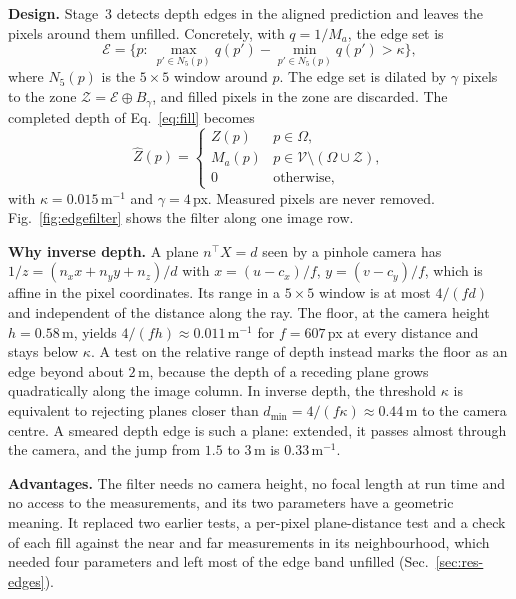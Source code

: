 \documentclass[conference]{IEEEtran}
\newcommand{\Dm}{Z}            %
\newcommand{\Dp}{M}            %
\newcommand{\Om}{\Omega}       %
\begin{document}
\textbf{Design.} Stage~3 detects depth edges in the aligned prediction and
leaves the pixels around them unfilled. Concretely, with \(q=1/\Dp_a\), the
edge set is
\begin{equation}
  \mathcal{E}=\Big\{p:\ \max_{p'\in N_5(p)} q(p')-\min_{p'\in N_5(p)} q(p')>\kappa\Big\},
  \label{eq:edges}
\end{equation}
where \(N_5(p)\) is the \(5{\times}5\) window around \(p\). The edge set is
dilated by \(\gamma\) pixels to the zone \(\mathcal{Z}=\mathcal{E}\oplus
B_\gamma\), and filled pixels in the zone are discarded. The completed depth
of Eq.~\eqref{eq:fill} becomes
\begin{equation}
  \hat \Dm(p) =
  \begin{cases}
    \Dm(p) & p\in\Om,\\
    \Dp_a(p) & p\in\mathcal{V}\setminus(\Om\cup\mathcal{Z}),\\
    0 & \text{otherwise},
  \end{cases}
  \label{eq:fillfinal}
\end{equation}
with \(\kappa=0.015\,\)m\(^{-1}\) and \(\gamma=4\,\)px. Measured pixels are
never removed. Fig.~\ref{fig:edgefilter} shows the filter along one image row.

\textbf{Why inverse depth.} A plane \(n^\top X=d\) seen by a pinhole camera has
\(1/z=(n_xx+n_yy+n_z)/d\) with \(x=(u-c_x)/f\), \(y=(v-c_y)/f\), which is affine
in the pixel coordinates. Its range in a \(5{\times}5\) window is at most
\(4/(fd)\) and independent of the distance along the ray. The floor, at the
camera height \(h=0.58\,\)m, yields \(4/(fh)\approx0.011\,\)m\(^{-1}\) for
\(f=607\,\)px at every distance and stays below \(\kappa\). A test on the relative
range of depth instead marks the floor as an edge beyond about \(2\,\)m, because
the depth of a receding plane grows quadratically along the image column. In
inverse depth, the threshold \(\kappa\) is equivalent to rejecting planes closer
than \(d_{\min}=4/(f\kappa)\approx0.44\,\)m to the camera centre. A smeared
depth edge is such a plane: extended, it passes almost through the camera, and
the jump from \(1.5\) to \(3\,\)m is \(0.33\,\)m\(^{-1}\).

\textbf{Advantages.} The filter needs no camera height, no focal length at run
time and no access to the measurements, and its two parameters have a
geometric meaning. It replaced two earlier tests, a per-pixel plane-distance
test and a check of each fill against the near and far measurements in its
neighbourhood, which needed four parameters and left most of the edge band
unfilled (Sec.~\ref{sec:res-edges}).
\end{document}
